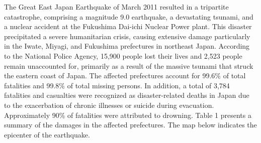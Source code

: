 \documentclass[12pt,halfline,a4paper]{ouparticle}
\begin{document}
The Great East Japan Earthquake of March 2011 resulted in a tripartite catastrophe, comprising a magnitude 9.0 earthquake, a devastating tsunami, and a nuclear accident at the Fukushima Dai-ichi Nuclear Power plant. This disaster precipitated a severe humanitarian crisis, causing extensive damage particularly in the Iwate, Miyagi, and Fukushima prefectures in northeast Japan. According to the National Police Agency, 15,900 people lost their lives and 2,523 people remain unaccounted for, primarily as a result of the massive tsunami that struck the eastern coast of Japan. The affected prefectures account for 99.6\% of total fatalities and 99.8\% of total missing persons. In addition, a total of 3,784 fatalities and casualties were recognized as disaster-related deaths in Japan due to the exacerbation of chronic illnesses or suicide during evacuation. Approximately 90\% of fatalities were attributed to drowning. Table 1 presents a summary of the damages in the affected prefectures. The map below indicates the epicenter of the earthquake.
\end{document}
